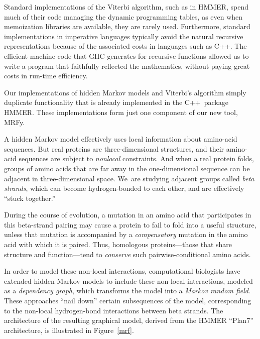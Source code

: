 \documentclass[preprint,nonatbib,blockstyle,nocopyrightspace,times]{sigplanconf}
\begin{document}
Standard implementations of the Viterbi algorithm, such as in HMMER, spend much of their code
managing the dynamic programming tables, as even when memoization libraries are available,
they are rarely used.
Furthermore, standard implementations in imperative languages typically avoid the natural
recursive representations because of the associated costs in languages such as C++.
The efficient machine code that GHC generates for recursive functions allowed us to write
a program that faithfully reflected the mathematics, without paying great costs in run-time
efficiency.


Our implementations of hidden Markov models and Viterbi's algorithm
simply duplicate 
functionality that is already implemented in the C++~package
HMMER.
These implementations form just one component of our new tool, MRFy.

A hidden Markov model effectively uses local information about
amino-acid sequences.
But real proteins are three-dimensional structures,
and their amino-acid sequences are subject to \emph{nonlocal}
constraints. 
And when a real protein folds, groups of amino acids
that are far away in the one-dimensional sequence can be
adjacent in three-dimensional space.
We~are studying adjacent groups called \emph{beta strands}, which
can become hydrogen-bonded to each other,
and are effectively ``stuck together.''

During the course of evolution, a mutation in an amino acid that participates
in this beta-strand pairing may cause a protein to fail to fold into a useful
structure, unless that mutation is accompanied by a \textit{compensatory}
mutation in the amino acid with which it is paired. 
Thus, homologous
proteins---those that share structure and function---tend to \textit{conserve}
such pairwise-conditional amino acids.

In order to model these non-local interactions, computational biologists
have extended hidden Markov models to include these non-local interactions,
modeled as a \textit{dependency graph}, which transforms the model into a
\textit{Markov random field}. These approaches ``nail down'' 
certain subsequences of the model, corresponding to the non-local hydrogen-bond 
interactions between beta strands.
The architecture of the 
resulting graphical model, derived from the HMMER ``Plan7'' architecture, is 
illustrated in Figure~\ref{mrf}.
\end{document}
